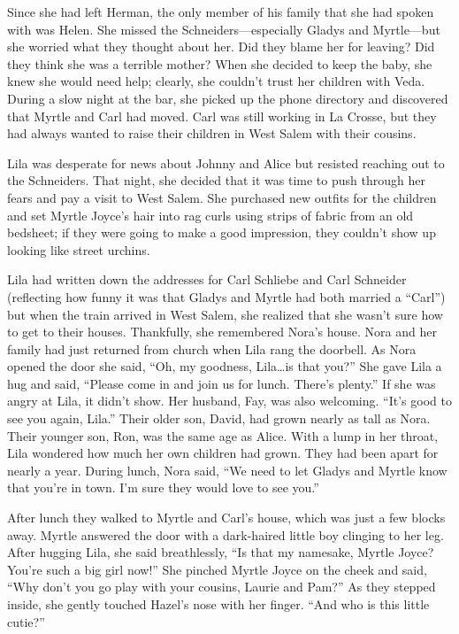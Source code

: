\documentclass[
  american,
  letterpaper,
]{book}
\begin{document}
Since she had left Herman, the only member of his family that she had
spoken with was Helen. She missed the Schneiders---especially Gladys and
Myrtle---but she worried what they thought about her. Did they blame her
for leaving? Did they think she was a terrible mother? When she decided
to keep the baby, she knew she would need help; clearly, she couldn't
trust her children with Veda. During a slow night at the bar, she picked
up the phone directory and discovered that Myrtle and Carl had moved.
Carl was still working in La Crosse, but they had always wanted to raise
their children in West Salem with their cousins.

Lila was desperate for news about Johnny and Alice but resisted reaching
out to the Schneiders. That night, she decided that it was time to push
through her fears and pay a visit to West Salem. She purchased new
outfits for the children and set Myrtle Joyce's hair into rag curls
using strips of fabric from an old bedsheet; if they were going to make
a good impression, they couldn't show up looking like street urchins.

Lila had written down the addresses for Carl Schliebe and Carl Schneider
(reflecting how funny it was that Gladys and Myrtle had both married a
``Carl'') but when the train arrived in West Salem, she realized that
she wasn't sure how to get to their houses. Thankfully, she remembered
Nora's house. Nora and her family had just returned from church when
Lila rang the doorbell. As Nora opened the door she said, ``Oh, my
goodness, Lila\ldots is that you?'' She gave Lila a hug and said,
``Please come in and join us for lunch. There's plenty.'' If she was
angry at Lila, it didn't show. Her husband, Fay, was also welcoming.
``It's good to see you again, Lila.'' Their older son, David, had grown
nearly as tall as Nora. Their younger son, Ron, was the same age as
Alice. With a lump in her throat, Lila wondered how much her own
children had grown. They had been apart for nearly a year. During lunch,
Nora said, ``We need to let Gladys and Myrtle know that you're in town.
I'm sure they would love to see you.''

After lunch they walked to Myrtle and Carl's house, which was just a few
blocks away. Myrtle answered the door with a dark-haired little boy
clinging to her leg. After hugging Lila, she said breathlessly, ``Is
that my namesake, Myrtle Joyce? You're such a big girl now!'' She
pinched Myrtle Joyce on the cheek and said, ``Why don't you go play with
your cousins, Laurie and Pam?'' As they stepped inside, she gently
touched Hazel's nose with her finger. ``And who is this little cutie?''
\end{document}
